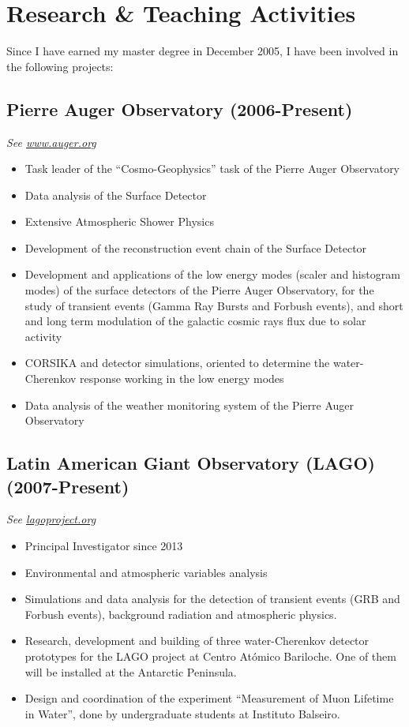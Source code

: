\ifeng
\section*{Research \& Teaching Activities}

Since I have earned my master degree in December 2005, I have been involved in the following projects:

\subsection*{Pierre Auger Observatory (2006-Present)}

{\small{\textit{See \href{http://www.auger.org/}{www.auger.org}}}}
\begin{itemize}
\item Task leader of the ``Cosmo-Geophysics'' task of the Pierre Auger Observatory
\item Data analysis of the Surface Detector
\item Extensive Atmospheric Shower Physics
\item Development of the reconstruction event chain of the Surface Detector
\item Development and applications of the low energy modes (scaler and histogram
modes) of the surface detectors of the Pierre Auger Observatory, for the study
of transient events (Gamma Ray Bursts and Forbush events), and short and long
term modulation of the galactic cosmic rays flux due to solar activity
\item CORSIKA and detector simulations, oriented to determine the
water-Cherenkov response working in the low energy modes
\item Data analysis of the weather monitoring system of the Pierre Auger
Observatory
\end{itemize}

\subsection*{Latin American Giant Observatory (LAGO) (2007-Present)}
{\small{\textit{See \href{http://lagoproject.org}{lagoproject.org}}}}
\begin{itemize}
\item Principal Investigator since 2013
\item Environmental and atmospheric variables analysis
\item Simulations and data analysis for the detection of transient events
(GRB and Forbush events), background radiation and atmospheric physics.
\item Research, development and building of three water-Cherenkov detector
prototypes for the LAGO project at Centro Atómico Bariloche. One of them will be
installed at the Antarctic Peninsula.
\item Design and coordination of the experiment ``Measurement of Muon Lifetime in Water'', done by undergraduate students at Instituto Balseiro.
\end{itemize}

